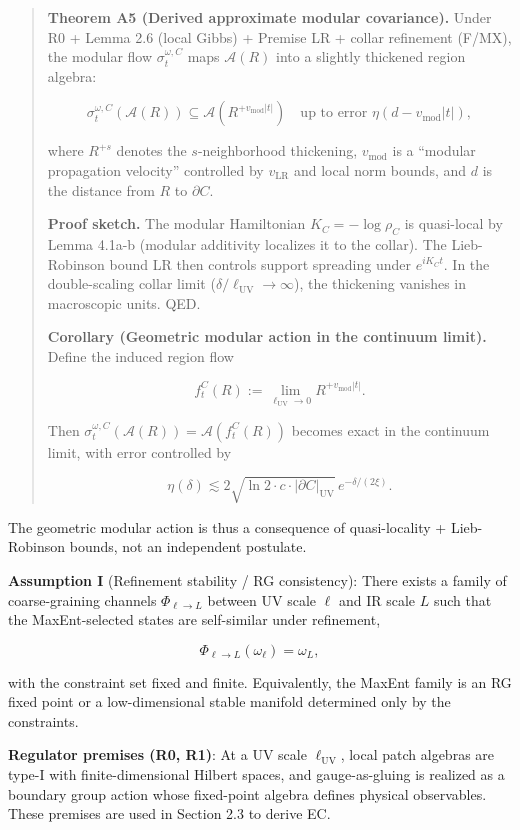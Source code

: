 \documentclass[
]{article}
\begin{document}
\begin{quote}
\textbf{Theorem A5 (Derived approximate modular covariance).} Under R0 +
Lemma 2.6 (local Gibbs) + Premise LR + collar refinement (F/MX), the
modular flow \(\sigma_t^{\omega,C}\) maps \(\mathcal{A}(R)\) into a
slightly thickened region algebra:

\[
\sigma_t^{\omega,C}(\mathcal{A}(R)) \subseteq \mathcal{A}(R^{+v_{\mathrm{mod}}|t|})
\quad \text{up to error } \eta(d - v_{\mathrm{mod}}|t|),
\]

where \(R^{+s}\) denotes the \(s\)-neighborhood thickening,
\(v_{\mathrm{mod}}\) is a ``modular propagation velocity'' controlled by
\(v_{\mathrm{LR}}\) and local norm bounds, and \(d\) is the distance
from \(R\) to \(\partial C\).

\textbf{Proof sketch.} The modular Hamiltonian \(K_C = -\log \rho_C\) is
quasi-local by Lemma 4.1a-b (modular additivity localizes it to the
collar). The Lieb-Robinson bound LR then controls support spreading
under \(e^{iK_C t}\). In the double-scaling collar limit
(\(\delta/\ell_{\mathrm{UV}} \to \infty\)), the thickening vanishes in
macroscopic units. QED.

\textbf{Corollary (Geometric modular action in the continuum limit).}
Define the induced region flow

\[
f_t^C(R) := \lim_{\ell_{\mathrm{UV}} \to 0} R^{+v_{\mathrm{mod}}|t|}.
\]

Then \(\sigma_t^{\omega,C}(\mathcal{A}(R)) = \mathcal{A}(f_t^C(R))\)
becomes exact in the continuum limit, with error controlled by

\[
\eta(\delta) \lesssim 2\sqrt{\ln 2 \cdot c \cdot |\partial C|_{\mathrm{UV}}} \, e^{-\delta/(2\xi)}.
\]
\end{quote}

The geometric modular action is thus a consequence of quasi-locality +
Lieb-Robinson bounds, not an independent postulate.

\textbf{Assumption I} (Refinement stability / RG consistency): There
exists a family of coarse-graining channels \(\Phi_{\ell\to L}\) between
UV scale \(\ell\) and IR scale \(L\) such that the MaxEnt-selected
states are self-similar under refinement,

\[
\Phi_{\ell\to L}(\omega_{\ell}) = \omega_{L},
\]

with the constraint set fixed and finite. Equivalently, the MaxEnt
family is an RG fixed point or a low-dimensional stable manifold
determined only by the constraints.

\textbf{Regulator premises (R0, R1)}: At a UV scale
\(\ell_{\mathrm{UV}}\), local patch algebras are type-I with
finite-dimensional Hilbert spaces, and gauge-as-gluing is realized as a
boundary group action whose fixed-point algebra defines physical
observables. These premises are used in Section 2.3 to derive EC.
\end{document}
